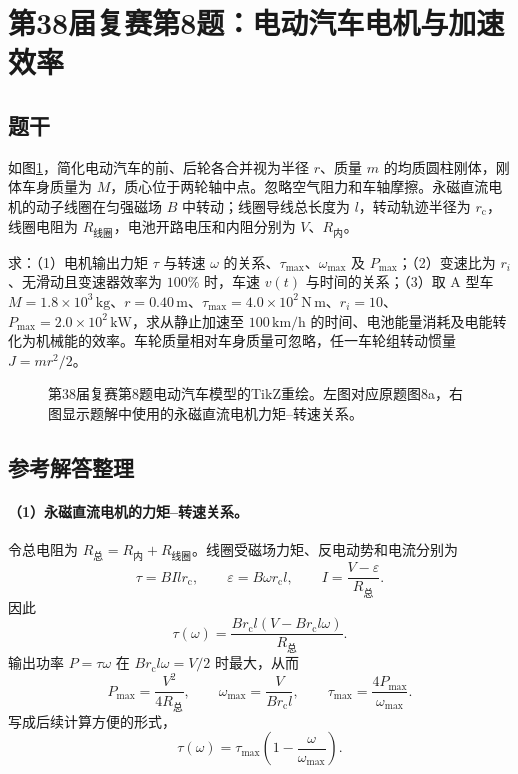 \section{第38届复赛第8题：电动汽车电机与加速效率}

\subsection{题干}
如图\ref{fig:cpho38q08}，简化电动汽车的前、后轮各合并视为半径 $r$、质量 $m$ 的均质圆柱刚体，刚体车身质量为 $M$，质心位于两轮轴中点。忽略空气阻力和车轴摩擦。永磁直流电机的动子线圈在匀强磁场 $B$ 中转动；线圈导线总长度为 $l$，转动轨迹半径为 $r_{\mathrm c}$，线圈电阻为 $R_{\text{线圈}}$，电池开路电压和内阻分别为 $V$、$R_{\text{内}}$。

求：（1）电机输出力矩 $\tau$ 与转速 $\omega$ 的关系、$\tau_{\max}$、$\omega_{\max}$ 及 $P_{\max}$；（2）变速比为 $r_i$、无滑动且变速器效率为 $100\%$ 时，车速 $v(t)$ 与时间的关系；（3）取 A 型车 $M=1.8\times10^3\,\mathrm{kg}$、$r=0.40\,\mathrm m$、$\tau_{\max}=4.0\times10^2\,\mathrm{N\,m}$、$r_i=10$、$P_{\max}=2.0\times10^2\,\mathrm{kW}$，求从静止加速至 $100\,\mathrm{km/h}$ 的时间、电池能量消耗及电能转化为机械能的效率。车轮质量相对车身质量可忽略，任一车轮组转动惯量 $J=mr^2/2$。

\begin{figure}[htbp]
  \centering
  
  \caption{第38届复赛第8题电动汽车模型的TikZ重绘。左图对应原题图8a，右图显示题解中使用的永磁直流电机力矩--转速关系。}
  \label{fig:cpho38q08}
\end{figure}

\subsection{参考解答整理}
\paragraph{（1）永磁直流电机的力矩--转速关系。}
令总电阻为 $R_{\text{总}}=R_{\text{内}}+R_{\text{线圈}}$。线圈受磁场力矩、反电动势和电流分别为
\[
\tau=BIlr_{\mathrm c},\qquad
\varepsilon=B\omega r_{\mathrm c}l,\qquad
I=\frac{V-\varepsilon}{R_{\text{总}}}.
\]
因此
\[
\tau(\omega)=\frac{Br_{\mathrm c}l\left(V-Br_{\mathrm c}l\omega\right)}{R_{\text{总}}}.
\]
输出功率 $P=\tau\omega$ 在 $Br_{\mathrm c}l\omega=V/2$ 时最大，从而
\[
\boxed{P_{\max}=\frac{V^2}{4R_{\text{总}}},\qquad
\omega_{\max}=\frac{V}{Br_{\mathrm c}l},\qquad
\tau_{\max}=\frac{4P_{\max}}{\omega_{\max}}.}
\]
写成后续计算方便的形式，
\[
\boxed{\tau(\omega)=\tau_{\max}\left(1-\frac{\omega}{\omega_{\max}}\right).}
\]

